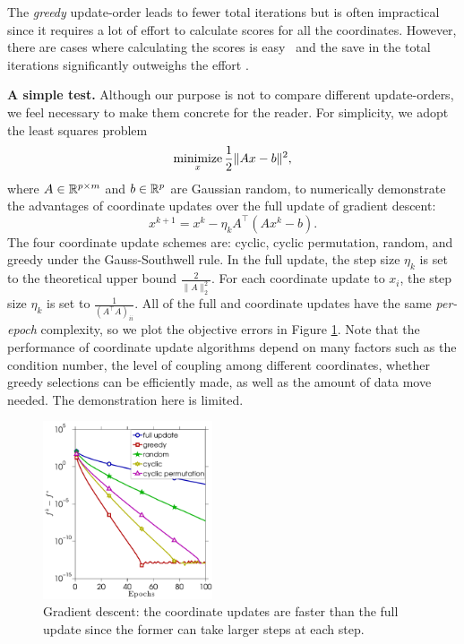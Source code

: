 The \emph{greedy} update-order leads to fewer total iterations but is often impractical since it requires a lot of effort to calculate  scores for all the coordinates. However, there are cases where calculating the scores is easy~\cite{bertsekas1999nonlinear, li2009gcoord, wu2008coordinate} and the save in the total iterations significantly outweighs the effort \cite{tseng2009_CGD, dhillon2011nearest, PYY_2013_GRock, schmidt2014coordinate}. 

\textbf{A simple test.} Although our purpose is not to compare different update-orders, we feel necessary to make them concrete for the reader. For simplicity, we adopt the least squares problem
$$\operatorname*{minimize}_{x} \frac{1}{2} \|A x - b\|^2,$$
where $A \in \mathbb{R}^{p \times m}$ and $b \in \mathbb{R}^p$ are Gaussian random, to numerically demonstrate the advantages of coordinate updates over the  full update of  gradient descent:
$$x^{k+1} = x^k - \eta_k A^{\top}(A x^k - b).$$
The four coordinate update schemes are: cyclic, cyclic permutation, random, and greedy under the Gauss-Southwell rule. 
In the full update, the step size $\eta_k$ is set to the theoretical upper bound $\frac{2}{\|A\|_2^2}$. For each coordinate update to $x_i$, the step size $\eta_k$ is set to $\frac{1}{(A^{\top}A)_{ii}}$. All of the full and coordinate updates have the same \emph{per-epoch} complexity, so we plot the objective errors in Figure \ref{fig:ls_full_vs_coord}. 
Note that the performance of coordinate update algorithms depend on many factors such as the condition number, the level of coupling among different coordinates, whether greedy selections can be efficiently made, as well as the amount of data move needed. The demonstration here is limited. 
\begin{figure}[!htbp] \centering
\includegraphics[width=50mm]{./figs/randn_matrix_cropped}

\caption{Gradient descent: the coordinate updates are faster than the full update since the former can take larger steps at each step.}
\label{fig:ls_full_vs_coord}
\end{figure}



